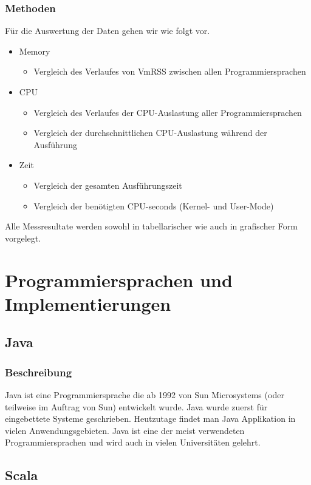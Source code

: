 \documentclass{fancydocument}
\begin{document}
\subsubsection{Methoden}
Für die Auswertung der Daten gehen wir wie folgt vor.
\begin{itemize}
\item Memory
\begin{itemize}
\item Vergleich des Verlaufes von VmRSS zwischen allen Programmiersprachen
\end{itemize}
\item CPU
\begin{itemize}
\item Vergleich des Verlaufes der CPU-Auslastung aller Programmiersprachen
\item Vergleich der durchschnittlichen CPU-Auslastung während der Ausführung
\end{itemize}
\item Zeit
\begin{itemize}
\item Vergleich der gesamten Ausführungszeit
\item Vergleich der benötigten CPU-seconds (Kernel- und User-Mode)
\end{itemize}
\end{itemize}
Alle Messresultate werden sowohl in tabellarischer wie auch in grafischer Form vorgelegt.
\section{Programmiersprachen und Implementierungen}

\subsection{Java}
\subsubsection{Beschreibung}

Java ist eine Programmiersprache die ab 1992 von Sun Microsystems (oder
teilweise im Auftrag von Sun) entwickelt wurde. Java wurde zuerst f\"ur
eingebettete Systeme geschrieben. Heutzutage findet man Java Applikation in
vielen Anwendungsgebieten.
Java ist eine der meist verwendeten Programmiersprachen und wird auch
in vielen Universitäten gelehrt. 

\subsection{Scala}
\end{document}
